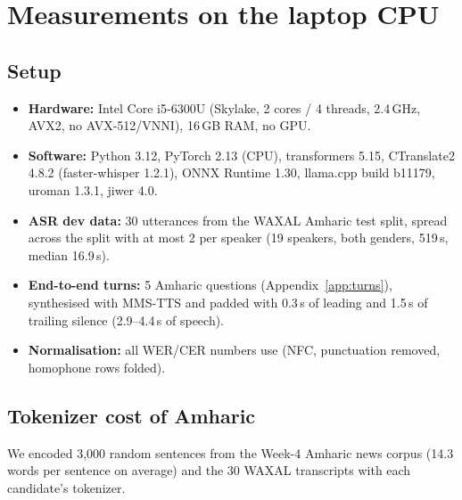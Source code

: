 \section{Measurements on the laptop CPU}
\label{sec:measure}

\subsection{Setup}
\begin{itemize}
  \item \textbf{Hardware:} Intel Core i5-6300U (Skylake, 2 cores / 4 threads, 2.4\,GHz, AVX2, no AVX-512/VNNI), 16\,GB RAM, no GPU.
  \item \textbf{Software:} Python 3.12, PyTorch 2.13 (CPU), transformers 5.15, CTranslate2 4.8.2 (faster-whisper 1.2.1),
  ONNX Runtime 1.30, llama.cpp build b11179, uroman 1.3.1, jiwer 4.0.
  \item \textbf{ASR dev data:} 30 utterances from the WAXAL Amharic test split, spread across the split
  with at most 2 per speaker (19 speakers, both genders, 519\,s, median 16.9\,s).
  \item \textbf{End-to-end turns:} 5 Amharic questions (Appendix~\ref{app:turns}), synthesised with MMS-TTS
  and padded with 0.3\,s of leading and 1.5\,s of trailing silence (2.9--4.4\,s of speech).
  \item \textbf{Normalisation:} all WER/CER numbers use  (NFC, punctuation removed,
  homophone rows folded).
\end{itemize}

\subsection{Tokenizer cost of Amharic}
\label{sec:m-tok}
We encoded 3{,}000 random sentences from the Week-4 Amharic news corpus (14.3 words per sentence on
average) and the 30 WAXAL transcripts with each candidate's tokenizer.

